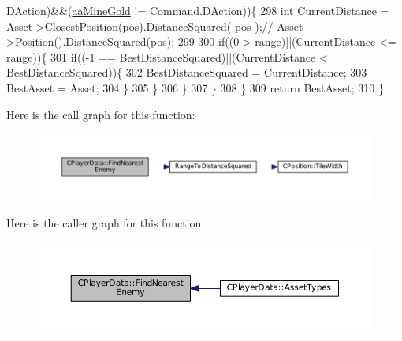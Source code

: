 \begin{DoxyCode}
      DAction)&&(\hyperlink{GameDataTypes_8h_ab47668e651a3032cfb9c40ea2d60d670abc45b1c4fbca1481e373a780a69bd56b}{aaMineGold} != Command.DAction))\{
298                 \textcolor{keywordtype}{int} CurrentDistance = Asset->ClosestPosition(pos).DistanceSquared( pos );\textcolor{comment}{//
      Asset->Position().DistanceSquared(pos);}
299                 
300                 \textcolor{keywordflow}{if}((0 > range)||(CurrentDistance <= range))\{
301                     \textcolor{keywordflow}{if}((-1 == BestDistanceSquared)||(CurrentDistance < BestDistanceSquared))\{
302                         BestDistanceSquared = CurrentDistance;
303                         BestAsset = Asset;
304                     \}
305                 \}
306             \}
307         \}
308     \}
309     \textcolor{keywordflow}{return} BestAsset;
310 \}
\end{DoxyCode}
Here is the call graph for this function\+:
\nopagebreak
\begin{figure}[H]
\begin{center}
\leavevmode
\includegraphics[width=350pt]{classCPlayerData_a5f0a1280933f7bb9a65ab256ecff1a69_cgraph}
\end{center}
\end{figure}
Here is the caller graph for this function\+:
\nopagebreak
\begin{figure}[H]
\begin{center}
\leavevmode
\includegraphics[width=350pt]{classCPlayerData_a5f0a1280933f7bb9a65ab256ecff1a69_icgraph}
\end{center}
\end{figure}
\hypertarget{classCPlayerData_a53c9e046c6f43fd83a0feb32b4fe999d}{}\label{classCPlayerData_a53c9e046c6f43fd83a0feb32b4fe999d} 
